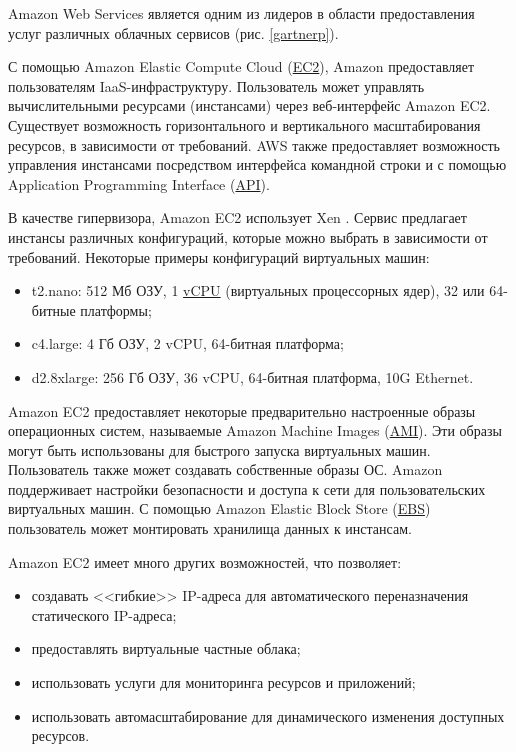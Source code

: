 Amazon Web Services является одним из лидеров в области предоставления услуг различных облачных сервисов (рис. \ref{gartnerp}).


С помощью Amazon Elastic Compute Cloud (\hyperlink{ec2}{EC2}), Amazon предоставляет пользователям IaaS-инфраструктуру.
Пользователь может управлять вычислительными ресурсами (инстансами) через веб-интерфейс Amazon EC2.
Существует возможность горизонтального и вертикального масштабирования ресурсов, в зависимости от требований.
AWS также предоставляет возможность управления инстансами посредством интерфейса командной строки и с помощью Application Programming Interface (\hyperlink{api}{API}).

В качестве гипервизора, Amazon EC2 использует Xen \cite{xen}.
Сервис предлагает инстансы различных конфигураций, которые можно выбрать в зависимости от требований.
Некоторые примеры конфигураций виртуальных машин:
\begin{itemize}
  \item t2.nano: 512 Мб ОЗУ, 1 \hyperlink{vcpu}{vCPU} (виртуальных процессорных ядер), 32 или 64-битные платформы;
  \item c4.large: 4 Гб ОЗУ, 2 vCPU, 64-битная платформа;
  \item d2.8xlarge: 256 Гб ОЗУ, 36 vCPU, 64-битная платформа, 10G Ethernet.
\end{itemize}

Amazon EC2 предоставляет некоторые предварительно настроенные образы операционных систем, называемые Amazon Machine Images (\hyperlink{ami}{AMI}).
Эти образы могут быть использованы для быстрого запуска виртуальных машин.
Пользователь также может создавать собственные образы ОС.
Amazon поддерживает настройки безопасности и доступа к сети для пользовательских виртуальных машин.
С помощью Amazon Elastic Block Store (\hyperlink{ebs}{EBS}) пользователь может монтировать хранилища данных к инстансам.

Amazon EC2 имеет много других возможностей, что позволяет:
\begin{itemize}
  \item создавать <<гибкие>> IP-адреса для автоматического переназначения статического IP-адреса;
  \item предоставлять виртуальные частные облака;
  \item использовать услуги для мониторинга ресурсов и приложений;
  \item использовать автомасштабирование для динамического изменения доступных ресурсов.
\end{itemize}

